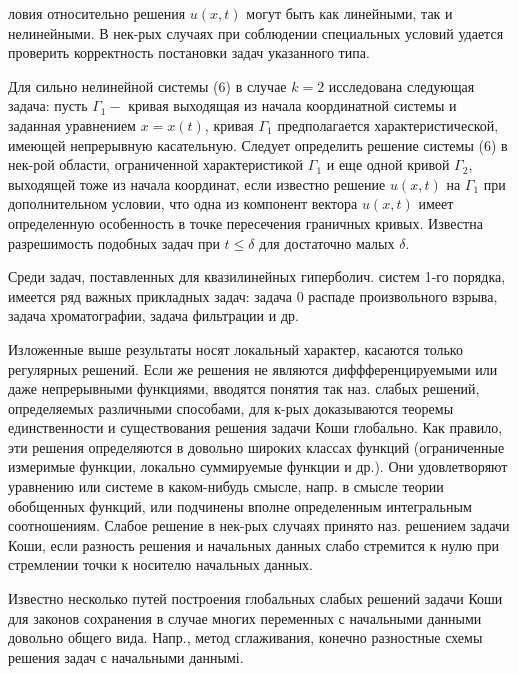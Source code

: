 \documentclass[10pt]{article}
\begin{document}
ловия относительно решения $u(x, t)$ могут быть как линейными, так и нелинейными. В нек-рых случаях при соблюдении специальных условий удается проверить корректность постановки задач указанного типа.



Для сильно нелинейной системы (6) в случае $k=2$ исследована следующая задача: пусть $\Gamma_{1}-$ кривая выходящая из начала координатной системы и заданная уравнением $x=x(t)$, кривая $\Gamma_{1}$ предполагается характеристической, имеющей непрерывную касательную. Следует определить решение системы (6) в нек-рой области, ограниченной характеристикой $\Gamma_{1}$ и еще одной кривой $\Gamma_{2}$, выходящей тоже из начала координат, если известно решение $u(x, t)$ на $\Gamma_{1}$ при дополнительном условии, что одна из компонент вектора $u(x, t)$ имеет определенную особенность в точке пересечения граничных кривых. Известна разрешимость подобных задач при $t \leqslant \delta$ для достаточно малых $\delta$.



Среди задач, поставленных для квазилинейных гиперболич. систем 1-го порядка, имеется ряд важных прикладных задач: задача 0 распаде произвольного взрыва, задача хроматографии, задача фильтрации и др.



Изложенные выше результаты носят локальный характер, касаются только регулярных решений. Если же решения не являются диффференцируемыми или даже непрерывными функциями, вводятся понятия так наз. слабых решений, определяемых различными способами, для к-рых доказываются теоремы единственности и существования решения задачи Коши глобально. Как правило, эти решения определяются в довольно широких классах функций (ограниченные измеримые функции, локально суммируемые функции и др.). Они удовлетворяют уравнению или системе в каком-нибудь смысле, напр. в смысле теории обобщенных функций, или подчинены вполне определенным интегральным соотношениям. Слабое решение в нек-рых случаях принято наз. решением задачи Коши, если разность решения и начальных данных слабо стремится к нулю при стремлении точки к носителю начальных данных.



Известно несколько путей построения глобальных слабых решений задачи Коши для законов сохранения в случае многих переменных с начальными данными довольно общего вида. Напр., метод сглаживания, конечно разностные схемы решения задач с начальными даннымі.
\end{document}
